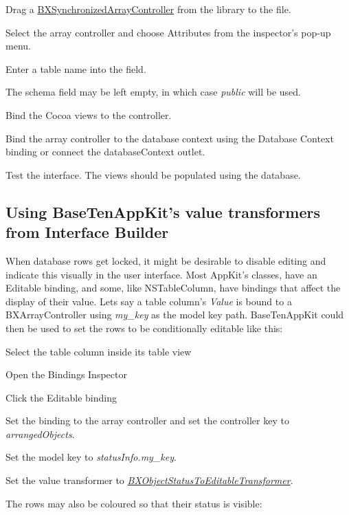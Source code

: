 \begin{DoxyEnumerate}
\item Drag a \hyperlink{interface_b_x_synchronized_array_controller}{B\+X\+Synchronized\+Array\+Controller} from the library to the file. 
\item Select the array controller and choose Attributes from the inspector's pop-\/up menu. 
\item Enter a table name into the field. 
\begin{DoxyItemize}
\item The schema field may be left empty, in which case {\itshape public} will be used. 
\end{DoxyItemize}
\item Bind the Cocoa views to the controller. 
\item Bind the array controller to the database context using the Database Context binding or connect the database\+Context outlet. 
\item Test the interface. The views should be populated using the database. 
\end{DoxyEnumerate}\hypertarget{using_appkit_classes_using_value_transformers_ib}{}\subsection{Using Base\+Ten\+App\+Kit's value transformers from Interface Builder}\label{using_appkit_classes_using_value_transformers_ib}
When database rows get locked, it might be desirable to disable editing and indicate this visually in the user interface. Most App\+Kit's classes, have an Editable binding, and some, like N\+S\+Table\+Column, have bindings that affect the display of their value. Lets say a table column's {\itshape Value} is bound to a B\+X\+Array\+Controller using {\itshape my\+\_\+key} as the model key path. Base\+Ten\+App\+Kit could then be used to set the rows to be conditionally editable like this\+: 
\begin{DoxyEnumerate}
\item Select the table column inside its table view 
\item Open the Bindings Inspector 
\item Click the Editable binding 
\item Set the binding to the array controller and set the controller key to {\itshape arranged\+Objects}. 
\item Set the model key to {\itshape status\+Info.\+my\+\_\+key}. 
\item Set the value transformer to {\itshape \hyperlink{interface_b_x_object_status_to_editable_transformer}{B\+X\+Object\+Status\+To\+Editable\+Transformer}}. 
\end{DoxyEnumerate}The rows may also be coloured so that their status is visible\+: 
